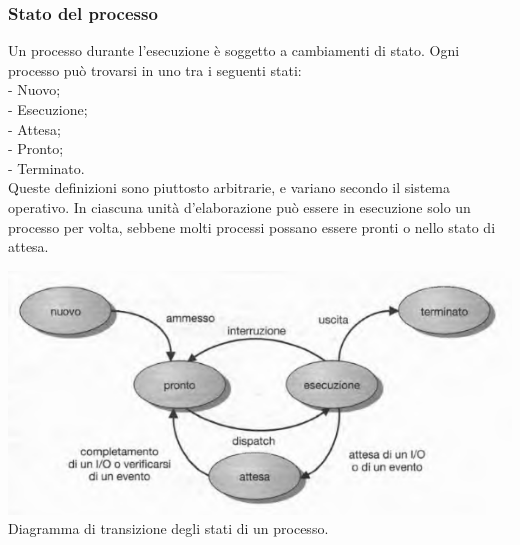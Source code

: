 \documentclass[11pt,a4paper]{article}
\begin{document}
\subsubsection{Stato del processo}
Un processo durante l'esecuzione è soggetto a cambiamenti di stato.
Ogni processo può trovarsi in uno tra i seguenti stati:\medskip\\
- Nuovo;\medskip\\
- Esecuzione;\medskip\\
- Attesa;\medskip\\
- Pronto;\medskip\\
- Terminato.\medskip\\
Queste definizioni sono piuttosto arbitrarie, e variano secondo il sistema operativo.
In ciascuna unità d'ela­borazione può essere in esecuzione solo un processo per volta, sebbene molti processi possa­no essere pronti o nello stato di attesa.\medskip\\
\begin{center}
  \includegraphics[scale=0.6]{img/0005.png}\\
  \caption{Diagramma di transizione degli stati di un processo.}
\end{center}
\end{document}
